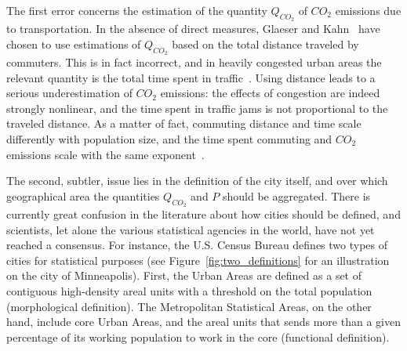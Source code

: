 The first error concerns the estimation of the quantity $Q_{CO_2}$ of $CO_2$ emissions due to
transportation. In the absence of direct measures, Glaeser and Kahn~\cite{Glaeser:2010} have chosen
to use estimations of $Q_{CO_2}$ based on the total distance traveled by commuters. This is in fact
incorrect, and in heavily congested urban areas the relevant quantity is the total time spent
in traffic~\cite{Louf:2014_mobility}. Using distance leads to a serious underestimation of
$CO_2$ emissions: the effects of congestion are indeed strongly nonlinear, and the time spent
in traffic jams is not proportional to the traveled distance. As a matter of fact, commuting
distance and time scale differently with population size, and the time spent commuting and
$CO_2$ emissions scale with the same exponent~\cite{Louf:2014_mobility}.

The second, subtler, issue lies in the definition of the city itself, and over
which geographical area the quantities $Q_{CO_2}$ and $P$ should be aggregated.
There is currently great confusion in the literature about how cities should be
defined, and scientists, let alone the various statistical agencies in the
world, have not yet reached a consensus. For instance, the U.S. Census Bureau
defines two types of cities for statistical purposes
(see Figure~\ref{fig:two_definitions} for an illustration on the city of Minneapolis).
First, the Urban Areas are defined as a set of contiguous high-density areal
units with a threshold on the total population (morphological definition). The Metropolitan Statistical
Areas, on the other hand, include core Urban Areas, and the areal units that
sends more than a given percentage of its working population to work in the
core (functional definition).

